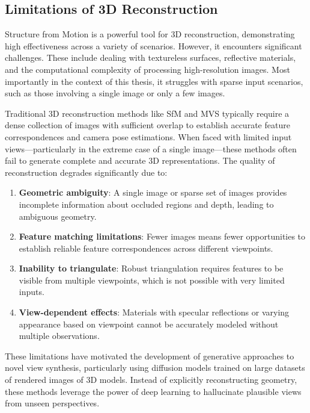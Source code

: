 \subsection{Limitations of 3D Reconstruction}

Structure from Motion is a powerful tool for 3D reconstruction, demonstrating high effectiveness across a variety of scenarios. However, it encounters significant challenges. These include dealing with textureless surfaces, reflective materials, and the computational complexity of processing high-resolution images. Most importantly in the context of this thesis, it struggles with sparse input scenarios, such as those involving a single image or only a few images.

Traditional 3D reconstruction methods like SfM and MVS typically require a dense collection of images with sufficient overlap to establish accurate feature correspondences and camera pose estimations. When faced with limited input views—particularly in the extreme case of a single image—these methods often fail to generate complete and accurate 3D representations. The quality of reconstruction degrades significantly due to:

\begin{enumerate}
  \item \textbf{Geometric ambiguity}: A single image or sparse set of images provides incomplete information about occluded regions and depth, leading to ambiguous geometry.

  \item \textbf{Feature matching limitations}: Fewer images means fewer opportunities to establish reliable feature correspondences across different viewpoints.

  \item \textbf{Inability to triangulate}: Robust triangulation requires features to be visible from multiple viewpoints, which is not possible with very limited inputs.

  \item \textbf{View-dependent effects}: Materials with specular reflections or varying appearance based on viewpoint cannot be accurately modeled without multiple observations.
\end{enumerate}

These limitations have motivated the development of generative approaches to novel view synthesis, particularly using diffusion models trained on large datasets of rendered images of 3D models. Instead of explicitly reconstructing geometry, these methods leverage the power of deep learning to hallucinate plausible views from unseen perspectives.

